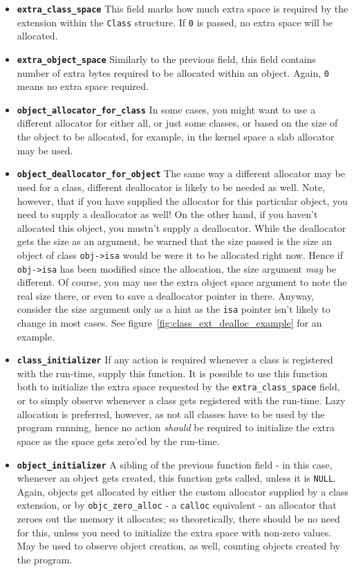 \begin{itemize}
  \item{\bf{\tt{extra\_class\_space}}} This field marks how much extra space is required by the extension within the \texttt{Class} structure. If \texttt{0} is passed, no extra space will be allocated.
  \item{\bf{\tt{extra\_object\_space}}} Similarly to the previous field, this field contains number of extra bytes required to be allocated within an object. Again, \texttt{0} means no extra space required.
  \item{\bf{\tt{object\_allocator\_for\_class}}} In some cases, you might want to use a different allocator for either all, or just some classes, or based on the size of the object to be allocated, for example, in the kernel space a slab allocator may be used.
  \item{\bf{\tt{object\_deallocator\_for\_object}}} The same way a different allocator may be used for a class, different deallocator is likely to be needed as well. Note, however, that if you have supplied the allocator for this particular object, you need to supply a deallocator as well! On the other hand, if you haven't allocated this object, you mustn't supply a deallocator.
  While the deallocator gets the size as an argument, be warned that the size passed is the size an object of class \verb=obj->isa= would be were it to be allocated right now. Hence if \verb=obj->isa= has been modified since the allocation, the size argument \emph{may} be different. Of course, you may use the extra object space argument to note the real size there, or even to save a deallocator pointer in there. Anyway, consider the size argument only as a hint as the \verb=isa= pointer isn't likely to change in most cases.
  See figure~\ref{fig:class_ext_dealloc_example} for an example.
  \item{\bf{\tt{class\_initializer}}} If any action is required whenever a class is registered with the run-time, supply this function. It is possible to use this function both to initialize the extra space requested by the \texttt{extra\_class\_space} field, or to simply observe whenever a class gets registered with the run-time. Lazy allocation is preferred, however, as not all classes have to be used by the program running, hence no action \emph{should} be required to initialize the extra space as the space gets zero'ed by the run-time.
  \item{\bf{\tt{object\_initializer}}} A sibling of the previous function field - in this case, whenever an object gets created, this function gets called, unless it is \texttt{NULL}. Again, objects get allocated by either the custom allocator supplied by a class extension, or by \verb=objc_zero_alloc= - a \verb=calloc= equivalent - an allocator that zeroes out the memory it allocates; so theoretically, there should be no need for this, unless you need to initialize the extra space with non-zero values. May be used to observe object creation, as well, counting objects created by the program.

\end{itemize}
